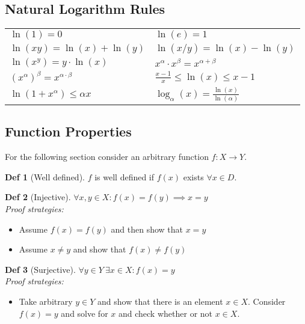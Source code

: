 \documentclass[a4paper, 10pt]{article}
\theoremstyle{definition}
\newtheorem*{definition}{Def}
\theoremstyle{ex}
\theoremstyle{named}
\begin{document}
\subsection*{Natural Logarithm Rules}
\begin{tabularx}{\linewidth}{XX}
    $\ln(1) = 0$ & $\ln(e) = 1$ \\
    $\ln(xy) = \ln(x) + \ln(y)$ & $\ln(x/y) = \ln(x) - \ln(y)$ \\
    $\ln(x^y) = y \cdot \ln(x)$ & $x^\alpha \cdot x^\beta = x^{\alpha + \beta}$ \\
    $(x^\alpha)^\beta = x^{\alpha \cdot \beta}$ & $\frac{x - 1}{x} \leq \ln(x) \leq x - 1$ \\
    $\ln(1 + x^\alpha) \leq \alpha x$ & $\log_\alpha(x) = \frac{\ln(x)}{\ln(\alpha)}$
\end{tabularx}

\subsection*{Function Properties}
For the following section consider an arbitrary function $f: X \to Y$.
\begin{definition}[Well defined]
    $f$ is well defined if $f(x)$ exists $\forall x \in D$.
\end{definition}

\begin{definition}[Injective]
    $\forall x, y \in X: f(x) = f(y) \implies x = y$ \\
    \textit{Proof strategies:}
    \begin{itemize}
        \item Assume $f(x)= f(y)$ and then show that $x = y$
        \item Assume $x \neq y$ and show that $f(x) \neq f(y)$
    \end{itemize}
\end{definition}

\begin{definition}[Surjective]
    $\forall y \in Y \ \exists x \in X: f(x) = y$ \\
    \textit{Proof strategies:}
    \begin{itemize}
        \item Take arbitrary $y \in Y$ and show that there is an element $x \in X$. Consider $f(x) = y$ and solve for $x$ and check whether or not $x \in X$.
    \end{itemize}
\end{definition}
\end{document}
